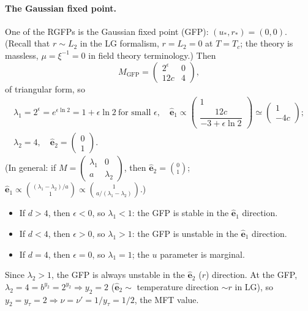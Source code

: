\paragraph{The Gaussian fixed point.} One of the RGFPs is the Gaussian fixed point (GFP):
$(u_*,r_*) = (0,0)$. (Recall that $r\sim L_2$ in the LG formalism, $r = L_2 = 0$ at $T = T_c$; the theory is
massless, $\mu = \xi^{-1} = 0$ in field theory terminology.) Then
\begin{equation}
  M_{\text{GFP}} = \begin{pmatrix}2^\epsilon & 0\\ 12c & 4\end{pmatrix},
\end{equation}
of triangular form, so
\begin{gather}
  \lambda_1 = 2^\epsilon = e^{\epsilon\ln 2} = 1+\epsilon\ln 2\ \text{for small }\epsilon,\quad
  \hat{\mathbf e}_1\propto\begin{pmatrix}1\\[6pt] \dfrac{12c}{-3+\epsilon\ln 2}\end{pmatrix}\simeq\begin{pmatrix}1\\ -4c\end{pmatrix};\nonumber\\
  \lambda_2 = 4,\quad \hat{\mathbf e}_2 = \begin{pmatrix}0\\1\end{pmatrix}.
\end{gather}
(In general: if $M = \left(\begin{smallmatrix}\lambda_1&0\\a&\lambda_2\end{smallmatrix}\right)$, then
$\hat{\mathbf e}_2 = \binom01$; $\hat{\mathbf e}_1\propto\binom{(\lambda_1-\lambda_2)/a}{1}\propto\binom{1}{a/(\lambda_1-\lambda_2)}$.)
\begin{itemize}
  \item If $d>4$, then $\epsilon<0$, so $\lambda_1<1$: the GFP is stable in the $\hat{\mathbf e}_1$ direction.
  \item If $d<4$, then $\epsilon>0$, so $\lambda_1>1$: the GFP is unstable in the $\hat{\mathbf e}_1$ direction.
  \item If $d = 4$, then $\epsilon = 0$, so $\lambda_1 = 1$; the $u$ parameter is marginal.
\end{itemize}
Since $\lambda_2>1$, the GFP is always unstable in the $\hat{\mathbf e}_2$ ($r$) direction. At the GFP,
$\lambda_2 = 4 = b^{y_2} = 2^{y_2}\Rightarrow y_2 = 2$ ($\hat{\mathbf e}_2\sim$ temperature direction $\sim r$
in LG), so $y_2 = y_\tau = 2\Rightarrow\nu = \nu' = 1/y_\tau = 1/2$, the MFT value.

